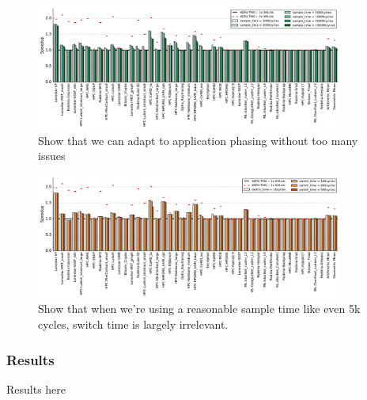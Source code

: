 \begin{figure}[tp]
    \centering
    \includegraphics[width=0.9\textwidth]{figures/plot_nvlink_sample_time.pdf}
    \caption{Show that we can adapt to application phasing without too many 
issues}
    \label{fig:sampletime}
\end{figure}


\begin{figure}[tp]
    \centering
    \includegraphics[width=0.9\textwidth]{figures/plot_nvlink_switch_time_sample_time5000.pdf}
    \caption{Show that when we're using a reasonable sample time like even 5k 
cycles, switch time is largely irrelevant.}
    \label{fig:switchtime}
\end{figure}

\subsubsection{Results}
Results here